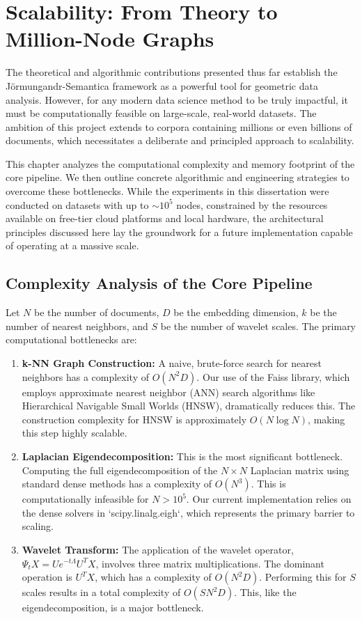 \chapter{Scalability: From Theory to Million-Node Graphs}
\label{chap:scalability}

The theoretical and algorithmic contributions presented thus far establish the Jörmungandr-Semantica framework as a powerful tool for geometric data analysis. However, for any modern data science method to be truly impactful, it must be computationally feasible on large-scale, real-world datasets. The ambition of this project extends to corpora containing millions or even billions of documents, which necessitates a deliberate and principled approach to scalability.

This chapter analyzes the computational complexity and memory footprint of the core pipeline. We then outline concrete algorithmic and engineering strategies to overcome these bottlenecks. While the experiments in this dissertation were conducted on datasets with up to $\sim10^5$ nodes, constrained by the resources available on free-tier cloud platforms and local hardware, the architectural principles discussed here lay the groundwork for a future implementation capable of operating at a massive scale.

\section{Complexity Analysis of the Core Pipeline}
Let $N$ be the number of documents, $D$ be the embedding dimension, $k$ be the number of nearest neighbors, and $S$ be the number of wavelet scales. The primary computational bottlenecks are:

\begin{enumerate}
    \item \textbf{k-NN Graph Construction:} A naive, brute-force search for nearest neighbors has a complexity of $O(N^2 D)$. Our use of the Faiss library, which employs approximate nearest neighbor (ANN) search algorithms like Hierarchical Navigable Small Worlds (HNSW), dramatically reduces this. The construction complexity for HNSW is approximately $O(N \log N)$, making this step highly scalable.

    \item \textbf{Laplacian Eigendecomposition:} This is the most significant bottleneck. Computing the full eigendecomposition of the $N \times N$ Laplacian matrix using standard dense methods has a complexity of $O(N^3)$. This is computationally infeasible for $N > 10^5$. Our current implementation relies on the dense solvers in `scipy.linalg.eigh`, which represents the primary barrier to scaling.

    \item \textbf{Wavelet Transform:} The application of the wavelet operator, $\Psi_t X = U e^{-t\Lambda} U^T X$, involves three matrix multiplications. The dominant operation is $U^T X$, which has a complexity of $O(N^2 D)$. Performing this for $S$ scales results in a total complexity of $O(S N^2 D)$. This, like the eigendecomposition, is a major bottleneck.
\end{enumerate}

